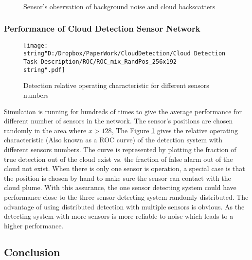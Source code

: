 \begin{figure}
\hfill{}\hfill{}\hfill{}\caption{Sensor's observation of background noise and cloud backscatters }
\end{figure}



\subsubsection{Performance of Cloud Detection Sensor Network}

\begin{figure}
\hfill{}\texttt{[image: \\string"D:/Dropbox/PaperWork/CloudDetection/Cloud Detection Task Description/ROC/ROC\_mix\_RandPos\_256x192\\string".pdf]}\hfill{}\hfill{}\caption{\label{fig:ROC-of-CDWSN}Detection relative operating characteristic
for different sensors numbers}
\end{figure}


Simulation is running for hundreds of times to give the average performance
for different number of sensors in the network. The sensor's positions
are chosen randomly in the area where $x>128$, The Figure \ref{fig:ROC-of-CDWSN}
gives the relative operating characteristic (Also known as a ROC curve)
of the detection system with different sensors numbers. The curve
is represented by plotting the fraction of true detection out of the
cloud exist vs. the fraction of false alarm out of the cloud not exist.
When there is only one sensor is operation, a special case is that
the position is chosen by hand to make sure the sensor can contact
with the cloud plume. With this assurance, the one sensor detecting
system could have performance close to the three sensor detecting
system randomly distributed. The advantage of using distributed detection
with multiple sensors is obvious. As the detecting system with more
sensors is more reliable to noise which leads to a higher performance. 


\subsection{Conclusion}

